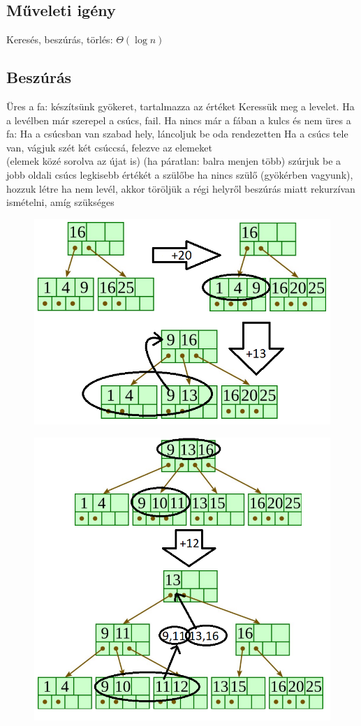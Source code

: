 \documentclass[12pt,a4paper]{article}
\begin{document}
\subsection{Műveleti igény}

\begin{outline}
	\1 Keresés, beszúrás, törlés: $\Theta(\log n)$
\end{outline}

\pagebreak

\subsection{Beszúrás}

\begin{outline}
	\1 Üres a fa: készítsünk gyökeret, tartalmazza az értéket
	\1 Keressük meg a levelet. Ha a levélben már szerepel a csúcs, fail.
	\1 Ha nincs már a fában a kulcs és nem üres a fa:
		\2 Ha a csúcsban van szabad hely, láncoljuk be oda rendezetten
		\2 Ha a csúcs tele van, vágjuk szét két csúccsá, felezve az elemeket\\
		(elemek közé sorolva az újat is) (ha páratlan: balra menjen több)
			\3 szúrjuk be a jobb oldali csúcs legkisebb értékét a szülőbe
				\4 ha nincs szülő (gyökérben vagyunk), hozzuk létre
				\4 ha nem levél, akkor töröljük a régi helyről
			\3 beszúrás miatt rekurzívan ismételni, amíg szükséges
\end{outline}

\begin{figure}[h!]
	\centering
	\includegraphics[width=0.5\linewidth]{b+ beszúrás egyszerű}
\end{figure}

\begin{figure}[h!]
	\centering
	\includegraphics[width=0.5\linewidth]{b+ beszúrás bonyolult}
\end{figure}
\end{document}
